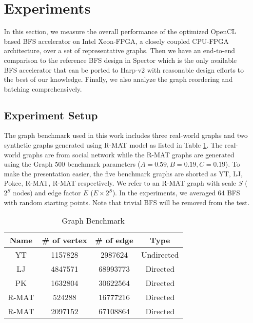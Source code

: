 \section{Experiments} \label{sec:experiment}
In this section, we measure the overall performance of the optimized 
OpenCL based BFS accelerator on Intel Xeon-FPGA, a closely coupled CPU-FPGA
architecture, over a set of representative graphs. Then we have an end-to-end 
comparison to the reference BFS design in Spector \cite{gautier2016spector} 
which is the only available BFS accelerator that can be ported to 
Harp-v2 with reasonable design efforts to the best of our knowledge. 
Finally, we also analyze the graph reordering and batching comprehensively.

\subsection{Experiment Setup}
The graph benchmark used in this work includes three real-world graphs and 
two synthetic graphs generated using R-MAT model \cite{chakrabarti2004rmat} 
as listed in Table \ref{tab:graph}. The real-world graphs are from social network \cite{yang2012defining, 
leskovec2009community, takac2012data} while the R-MAT graphs are generated 
using the Graph 500 benchmark parameters ($A=0.59, B=0.19, C=0.19$). To make the 
presentation easier, the five benchmark graphs are shorted as YT, 
LJ, Pokec, R-MAT\uppercase\expandafter{}, 
R-MAT\uppercase\expandafter{} respectively. We refer 
to an R-MAT graph with scale $S$ ($2^{S}$ nodes) and edge factor $E$ ($E\times 2^{S}$). 
In the experiments, we averaged 64 BFS with random starting points. Note that 
trivial BFS will be removed from the test.

\begin{table}
    \centering
  \caption{Graph Benchmark}
  \label{tab:graph}
  \begin{tabular}{cccc}
    \toprule
      Name & \# of vertex & \# of edge & Type \\
    \midrule
      YT \cite{yang2012defining} & 1157828 & 2987624 & Undirected \\
      LJ \cite{leskovec2009community} & 4847571 & 68993773 & Directed \\
      PK \cite{takac2012data} & 1632804 & 30622564 & Directed \\
      R-MAT\uppercase\expandafter{\romannumeral1} & 524288 & 16777216 & Directed \\
      R-MAT\uppercase\expandafter{\romannumeral2} & 2097152 & 67108864 & Directed \\
  \bottomrule
\end{tabular}
\vspace{-1em}
\end{table}

